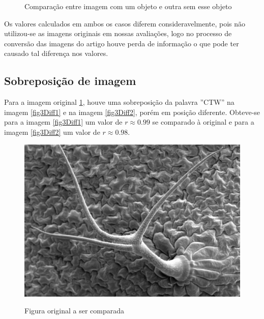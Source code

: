 \documentclass[10pt,a4paper]{article}
\begin{document}
\begin{figure}[h!]
\begin{center}
    \caption{Comparação entre imagem com um objeto e outra sem esse objeto
    }
  \end{center}
\end{figure}

Os valores calculados em ambos os casos diferem consideravelmente, pois não utilizou-se
as imagens originais em nossas avaliações, logo no processo de conversão das imagens do
artigo houve perda de informação o que pode ter causado tal diferença
nos valores.


\newpage
\subsection{Sobreposição de imagem}
Para a imagem original \ref{fig3}, houve uma sobreposição da palavra
''CTW'' na imagem \ref{fig3Diff1} e na imagem \ref{fig3Diff2},
porém em posição diferente. Obteve-se para a imagem \ref{fig3Diff1}
um valor de $r\approx 0.99$ se comparado à original e para a imagem \ref{fig3Diff2} 
um valor de $r\approx 0.98$.
\begin{figure}[h!]
  \begin{center}
    \includegraphics[scale=0.25]{photos/m15_tricome}\label{fig3}
    \caption{Figura original a ser comparada}
  \end{center}
\end{figure}
\end{document}
